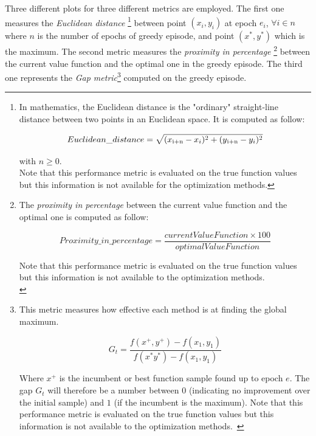 Three different plots for three different metrics are employed. The first one measures the \textit{Euclidean distance} \footnote{In mathematics, the Euclidean distance is the "ordinary" straight-line distance between two points in an Euclidean space. It is computed as follow: 
	
	\begin{equation}
		Euclidean\_distance = \sqrt{(x\textsubscript{i+n} - x_i)^2 + (y\textsubscript{i+n} - y_i)^2}
	\end{equation}

with $n \ge 0$. \\
	
Note that this performance metric is evaluated on the true function values but this information is not available for the optimization methods.} between point $(x_i, y_i)$ at epoch $e_i$, $\forall i \in n$ where $n$ is the number of epochs of greedy episode, and point $(x^*, y^*)$ which is the maximum. The second metric measures the \textit{proximity in percentage} \footnote{The \textit{proximity in percentage} between the current value function and the optimal one is computed as follow:

\begin{equation}
Proximity\_in\_ percentage = \frac{currentValueFunction \times 100}{optimalValueFunction}
\end{equation}

Note that this performance metric is evaluated on the true function values but this information is not available to the optimization methods. \\ } between the current value function and the optimal one in the greedy episode. The third one represents the \textit{Gap metric}\footnote{This metric measures how effective each method is at finding the global maximum.

\begin{equation}
G_t = \dfrac{f(x^+, y^+) - f(x_1, y_1)}{f(x^* y^*) - f(x_1, y_1)}
\end{equation}

Where $x^+$ is the incumbent or best function sample found up to epoch $e$. The gap $G_t$ will therefore be a number between $0$ (indicating no improvement over the initial sample) and $1$ (if the incumbent is the maximum). Note that this performance metric is evaluated on the true function values but this information is not available to the optimization methods.~\cite{Hoffman:2011:PAB:3020548.3020587}} computed on the greedy episode. \\


